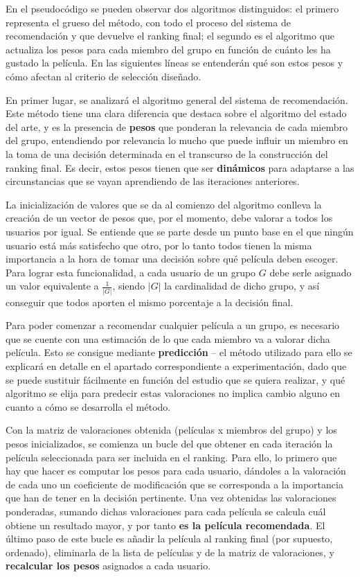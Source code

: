 En el pseudocódigo se pueden observar dos algoritmos distinguidos: el primero representa el grueso del método, con todo el proceso del sistema de recomendación y que devuelve el ranking final; el segundo es el algoritmo que actualiza los pesos para cada miembro del grupo en función de cuánto les ha gustado la película. En las siguientes líneas se entenderán qué son estos pesos y cómo afectan al criterio de selección diseñado.

En primer lugar, se analizará el algoritmo general del sistema de recomendación. Este método tiene una clara diferencia que destaca sobre el algoritmo del estado del arte, y es la presencia de \textbf{pesos} que ponderan la relevancia de cada miembro del grupo, entendiendo por relevancia lo mucho que puede influir un miembro en la toma de una decisión determinada en el transcurso de la construcción del ranking final. Es decir, estos pesos tienen que ser \textbf{dinámicos} para adaptarse a las circunstancias que se vayan aprendiendo de las iteraciones anteriores.

La inicialización de valores que se da al comienzo del algoritmo conlleva la creación de un vector de pesos que, por el momento, debe valorar a todos los usuarios por igual. Se entiende que se parte desde un punto base en el que ningún usuario está más satisfecho que otro, por lo tanto todos tienen la misma importancia a la hora de tomar una decisión sobre qué película deben escoger. Para lograr esta funcionalidad, a cada usuario de un grupo $G$ debe serle asignado un valor equivalente a $\frac{1}{|G|}$, siendo $|G|$ la cardinalidad de dicho grupo, y así conseguir que todos aporten el mismo porcentaje a la decisión final.

Para poder comenzar a recomendar cualquier película a un grupo, es necesario que se cuente con una estimación de lo que cada miembro va a valorar dicha película. Esto se consigue mediante \textbf{predicción} -- el método utilizado para ello se explicará en detalle en el apartado correspondiente a experimentación, dado que se puede sustituir fácilmente en función del estudio que se quiera realizar, y qué algoritmo se elija para predecir estas valoraciones no implica cambio alguno en cuanto a cómo se desarrolla el método.

Con la matriz de valoraciones obtenida (películas x miembros del grupo) y los pesos inicializados, se comienza un bucle del que obtener en cada iteración la película seleccionada para ser incluida en el ranking. Para ello, lo primero que hay que hacer es computar los pesos para cada usuario, dándoles a la valoración de cada uno un coeficiente de modificación que se corresponda a la importancia que han de tener en la decisión pertinente. Una vez obtenidas las valoraciones ponderadas, sumando dichas valoraciones para cada película se calcula cuál obtiene un resultado mayor, y por tanto \textbf{es la película recomendada}. El último paso de este bucle es añadir la película al ranking final (por supuesto, ordenado), eliminarla de la lista de películas y de la matriz de valoraciones, y \textbf{recalcular los pesos} asignados a cada usuario.

